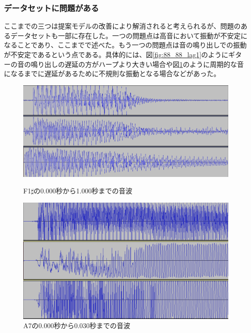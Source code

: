 \subsubsection{データセットに問題がある}

ここまでの三つは提案モデルの改善により解消されると考えられるが、問題のあるデータセットも一部に存在した。一つの問題点は高音において振動が不安定になることであり、ここまでで述べた。もう一つの問題点は音の鳴り出しでの振動が不安定であるという点である。具体的には、図\ref{fig:88_88_lag1}のようにギターの音の鳴り出しの遅延の方がハープより大きい場合や図\ref{fig:88_88_lag2}のように周期的な音になるまでに遅延があるために不規則な振動となる場合などがあった。

\begin{figure}[b]
\begin{center}
\begin{minipage}{0.48\hsize}
\begin{center}
\includegraphics[width=0.9\hsize]{figure/88_88/f1s.png}
\caption{F1$\sharp$の0.000秒から1.000秒までの音波}
\label{fig:88_88_lag1}
\end{center}
\end{minipage}
\begin{minipage}{0.48\hsize}
\begin{center}
\includegraphics[width=0.75\hsize]{figure/88_88_det/a7_0_0030.png}
\caption{A7の0.000秒から0.030秒までの音波}
\label{fig:88_88_lag2}
\end{center}
\end{minipage}
\end{center}
\end{figure}